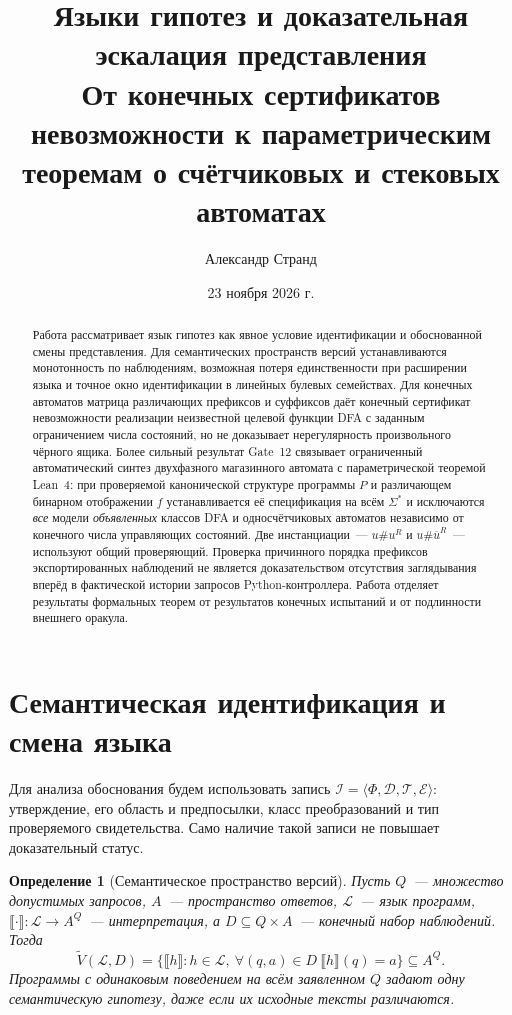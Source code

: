 \documentclass[11pt,a4paper]{article}
\title{\bfseries\color{ink}Языки гипотез и доказательная эскалация представления\\[4pt]
\large\normalfont От конечных сертификатов невозможности к параметрическим теоремам о счётчиковых и стековых автоматах}
\author{Александр Странд}
\date{23 ноября 2026 г.}
\newtheorem{definition}{Определение}[section]
\newcommand{\sem}[1]{\llbracket #1\rrbracket}
\newcommand{\VS}{\widetilde V}
\begin{document}
\maketitle
\vspace{-1.0em}
\begin{abstract}
Работа рассматривает язык гипотез как явное условие идентификации и обоснованной смены представления. Для семантических пространств версий устанавливаются монотонность по наблюдениям, возможная потеря единственности при расширении языка и точное окно идентификации в линейных булевых семействах. Для конечных автоматов матрица различающих префиксов и суффиксов даёт конечный сертификат невозможности реализации неизвестной целевой функции DFA с заданным ограничением числа состояний, но не доказывает нерегулярность произвольного чёрного ящика. Более сильный результат Gate~12 связывает ограниченный автоматический синтез двухфазного магазинного автомата с параметрической теоремой Lean~4: при проверяемой канонической структуре программы $P$ и различающем бинарном отображении $f$ устанавливается её спецификация на всём $\Sigma^*$ и исключаются \emph{все} модели \emph{объявленных} классов DFA и односчётчиковых автоматов независимо от конечного числа управляющих состояний. Две инстанциации~--- $u\#u^R$ и $u\#\overline{u}^R$~--- используют общий проверяющий. Проверка причинного порядка префиксов экспортированных наблюдений не является доказательством отсутствия заглядывания вперёд в фактической истории запросов Python-контроллера. Работа отделяет результаты формальных теорем от результатов конечных испытаний и от подлинности внешнего оракула.
\end{abstract}

\section{Семантическая идентификация и смена языка}

Для анализа обоснования будем использовать запись $\mathcal I=\langle\Phi,\mathcal D,\mathcal T,\mathcal E\rangle$: утверждение, его область и предпосылки, класс преобразований и тип проверяемого свидетельства. Само наличие такой записи не повышает доказательный статус.

\begin{definition}[Семантическое пространство версий]
Пусть $Q$~--- множество допустимых запросов, $A$~--- пространство ответов, $\mathcal L$~--- язык программ, $\sem\cdot:\mathcal L\to A^Q$~--- интерпретация, а $D\subseteq Q\times A$~--- конечный набор наблюдений. Тогда
\begin{equation}\label{eq:version}
\VS(\mathcal L,D)=\{\sem h:h\in\mathcal L,\ \forall(q,a)\in D\ \sem h(q)=a\}\subseteq A^Q.
\end{equation}
Программы с одинаковым поведением на всём заявленном $Q$ задают одну семантическую гипотезу, даже если их исходные тексты различаются.
\end{definition}
\end{document}
